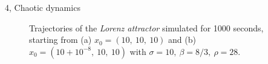 \documentclass[10pt,a4paper]{article}
\begin{document}
\begin{task}{4, Chaotic dynamics}
\begin{figure}[H]
    \centering
    \hfill
    \caption{Trajectories of the \textit{Lorenz attractor} simulated for 1000 seconds, starting from (a) $x_0 = (10,\ 10,\ 10)$ and (b) $\hat{x}_0 = (10+10^{-8},\ 10,\ 10)$ with $\sigma = 10,\ \beta = 8/3,\ \rho = 28$.}
    \label{fig:lorenz-trajs-1000s}
\end{figure}


\end{task}
\end{document}
